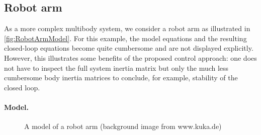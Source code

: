 \subsection{Robot arm}
As a more complex multibody system, we consider a robot arm as illustrated in \autoref{fig:RobotArmModel}.
For this example, the model equations and the resulting closed-loop equations become quite cumbersome and are not displayed explicitly.
However, this illustrates some benefits of the proposed control approach: one does not have to inspect the full system inertia matrix but only the much less cumbersome body inertia matrices to conclude, for example, stability of the closed loop.

\paragraph{Model.}

\begin{figure}
 \centering
 
 \caption{A model of a robot arm (background image from www.kuka.de)}
 \label{fig:RobotArmModel}
\end{figure}

